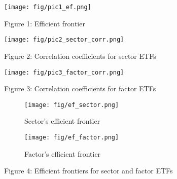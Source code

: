 \documentclass{article}
\begin{document}
\begin{figure}[h]
\centering

 \texttt{[image: fig/pic1\_ef.png]}
 \label{fig1:ef}
 \caption{Figure 1: Efficient frontier}
  
 \texttt{[image: fig/pic2\_sector\_corr.png]}
 \label{fig2:sector_corr}
 \caption{Figure 2: Correlation coefficients for sector ETFs}
  
 \texttt{[image: fig/pic3\_factor\_corr.png]}
 \label{fig3:factor_corr}
 \caption{Figure 3: Correlation coefficients for factor ETFs}

 \begin{subfigure}[b]{0.4\textwidth}    
  \centering\texttt{[image: fig/ef\_sector.png]}
  \caption{Sector's efficient frontier}   
  \end{subfigure}
  \hfill
  
  \begin{subfigure}[b]{0.4\textwidth} 
   \centering\texttt{[image: fig/ef\_factor.png]}
   \caption{Factor's efficient frontier}  
  \end{subfigure}
  \label{fig4:ef_sec_fac}
  \caption{Figure 4: Efficient frontiers for sector and factor ETFs}
 
\end{figure}
\end{document}
